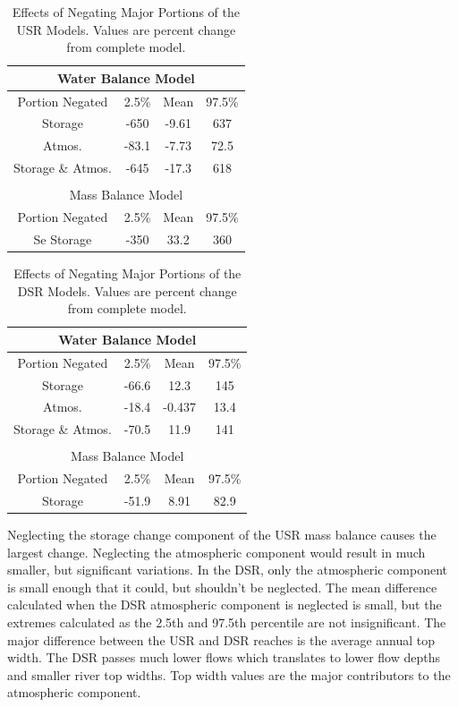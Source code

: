 \begin{linenumbers}
\begin{table}[htbp]
\centering
\caption[Effects of Negating Major Portions of the USR Models.]{Effects of Negating Major Portions of the USR Models.  Values are percent change from complete model.}
\label{tab:USRNegate}
\begin{tabular}{c|ccc}
	\multicolumn{4}{c}{Water Balance Model} \\
	\toprule
	Portion Negated	& 2.5\% & Mean & 97.5\% \\
	\midrule
	\midrule
	Storage&			-650&	-9.61&	637\\
	Atmos.&				-83.1&	-7.73&	72.5\\
	Storage \& Atmos.&	-645&	-17.3&	618\\
	\bottomrule
	\multicolumn{4}{c}{} \\
	\multicolumn{4}{c}{Mass Balance Model} \\
	\toprule
	Portion Negated	& 2.5\% & Mean & 97.5\% \\
	\midrule
	\midrule
	Se Storage&			-350&	33.2&	360\\
	\bottomrule
\end{tabular}
\end{table}

\begin{table}[htbp]
\centering
\caption[Effects of Negating Major Portions of the DSR Models.]{Effects of Negating Major Portions of the DSR Models.  Values are percent change from complete model.}
\label{tab:DSRNegate}
\begin{tabular}{c|ccc}
	\multicolumn{4}{c}{Water Balance Model} \\
	\toprule
	Portion Negated	& 2.5\% & Mean & 97.5\% \\
	\midrule
	\midrule
	Storage&			-66.6&	12.3&	145\\
	Atmos.&				-18.4&	-0.437&	13.4\\
	Storage \& Atmos.&	-70.5&	11.9&	141\\
	\bottomrule
	\multicolumn{4}{c}{} \\
	\multicolumn{4}{c}{Mass Balance Model} \\
	\toprule
	Portion Negated	& 2.5\% & Mean & 97.5\% \\
	\midrule
	\midrule
	Storage& 			-51.9&	8.91&	82.9\\
	\bottomrule
\end{tabular}
\end{table}

Neglecting the storage change component of the USR mass balance causes the largest change.  Neglecting the atmospheric component would result in much smaller, but significant variations.  In the DSR, only the atmospheric component is small enough that it could, but shouldn't be neglected.  The mean difference calculated when the DSR atmospheric component is neglected is small, but the extremes calculated as the 2.5th and 97.5th percentile are not insignificant.  The major difference between the USR and DSR reaches is the average annual top width.  The DSR passes much lower flows which translates to lower flow depths and smaller river top widths.  Top width values are the major contributors to the atmospheric component.


\end{linenumbers}

